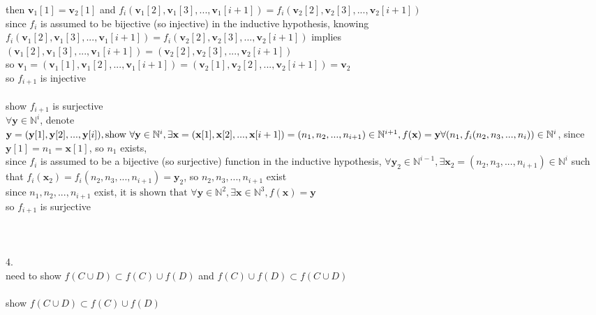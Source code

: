 \documentclass[12pt, border = 4pt, multi]{article} %
\begin{document}
then $\textbf{v}_1[1] = \textbf{v}_2[1]$ and $f_i(\textbf{v}_1[2], \textbf{v}_1[3], ..., \textbf{v}_1[i + 1]) = f_i(\textbf{v}_2[2], \textbf{v}_2[3], ..., \textbf{v}_2[i + 1])$\\
since $f_i$ is assumed to be bijective (so injective) in the inductive hypothesis, knowing $f_i(\textbf{v}_1[2], \textbf{v}_1[3], ..., \textbf{v}_1[i + 1]) = f_i(\textbf{v}_2[2], \textbf{v}_2[3], ..., \textbf{v}_2[i + 1])$ implies $(\textbf{v}_1[2], \textbf{v}_1[3], ..., \textbf{v}_1[i + 1]) = (\textbf{v}_2[2], \textbf{v}_2[3], ..., \textbf{v}_2[i + 1])$\\
so $\textbf{v}_1 = (\textbf{v}_1[1], \textbf{v}_1[2], ..., \textbf{v}_1[i + 1]) = (\textbf{v}_2[1], \textbf{v}_2[2], ..., \textbf{v}_2[i + 1]) = \textbf{v}_2$\\
so $f_{i + 1}$ is injective\\
\\
show $f_{i + 1}$ is surjective\\
$\forall \textbf{y} \in \mathbb{N} ^ i$, denote $\textbf{y} = (\textbf{y}[1], \textbf{y}[2], ..., \textbf{y}[i]),\\
\text{show }\forall \textbf{y} \in \mathbb{N} ^ i, \exists \textbf{x} = (\textbf{x}[1], \textbf{x}[2], ..., \textbf{x}[i + 1]) = (n_1, n_2, ..., n_{i + 1})\in \mathbb{N} ^ {i + 1}, f(\textbf{x}) = \textbf{y}\\
\forall (n_1, f_i(n_2, n_3, ..., n_i)) \in \mathbb{N} ^ i$, since $\textbf{y}[1] = n_1 = \textbf{x}[1]$, so $n_1$ exists,\\
since $f_i$ is assumed to be a bijective (so surjective) function in the inductive hypothesis, $\forall \textbf{y}_2 \in \mathbb{N} ^ {i - 1}, \exists \textbf{x}_2 = (n_2, n_3, ..., n_{i + 1}) \in \mathbb{N} ^ i$ such that $f_i(\textbf{x}_2) = f_i(n_2, n_3, ..., n_{i + 1}) = \textbf{y}_2$, so $n_2, n_3, ..., n_{i + 1}$ exist\\
since $n_1, n_2, ..., n_{i + 1}$ exist, $\text{it is shown that }\forall \textbf{y} \in \mathbb{N} ^ 2, \exists \textbf{x} \in \mathbb{N} ^ 3, f(\textbf{x}) = \textbf{y}$\\
so $f_{i + 1}$ is surjective\\
\\
\\
\\
4.\\
need to show $f(C \cup D) \subset f(C) \cup f(D)$ and $f(C) \cup f(D) \subset f(C \cup D)$\\
\\
show $f(C \cup D) \subset f(C) \cup f(D)$\\
\end{document}

